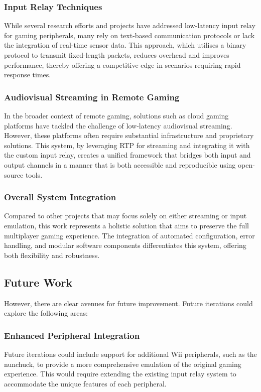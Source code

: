 \subsubsection{Input Relay Techniques}
While several research efforts and projects have addressed low-latency input relay for gaming peripherals, many rely on text-based communication protocols or lack the integration of real-time sensor data. This approach, which utilises a binary protocol to transmit fixed-length packets, reduces overhead and improves performance, thereby offering a competitive edge in scenarios requiring rapid response times.

\subsubsection{Audiovisual Streaming in Remote Gaming}
In the broader context of remote gaming, solutions such as cloud gaming platforms have tackled the challenge of low-latency audiovisual streaming. However, these platforms often require substantial infrastructure and proprietary solutions. This system, by leveraging RTP for streaming and integrating it with the custom input relay, creates a unified framework that bridges both input and output channels in a manner that is both accessible and reproducible using open-source tools.

\subsubsection{Overall System Integration}
Compared to other projects that may focus solely on either streaming or input emulation, this work represents a holistic solution that aims to preserve the full multiplayer gaming experience. The integration of automated configuration, error handling, and modular software components differentiates this system, offering both flexibility and robustness.

\subsection{Future Work}
However, there are clear avenues for future improvement. Future iterations could explore the following areas:

\subsubsection{Enhanced Peripheral Integration}
Future iterations could include support for additional Wii peripherals, such as the nunchuck, to provide a more comprehensive emulation of the original gaming experience. This would require extending the existing input relay system to accommodate the unique features of each peripheral.

